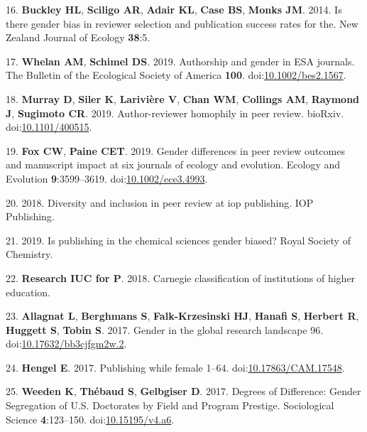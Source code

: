 \documentclass[11pt,]{article}
\begin{document}
\hypertarget{ref-buckley_is_2014}{}
16. \textbf{Buckley HL}, \textbf{Sciligo AR}, \textbf{Adair KL},
\textbf{Case BS}, \textbf{Monks JM}. 2014. Is there gender bias in
reviewer selection and publication success rates for the. New Zealand
Journal of Ecology \textbf{38}:5.

\hypertarget{ref-Whelan2019}{}
17. \textbf{Whelan AM}, \textbf{Schimel DS}. 2019. Authorship and gender
in ESA journals. The Bulletin of the Ecological Society of America
\textbf{100}.
doi:\href{https://doi.org/10.1002/bes2.1567}{10.1002/bes2.1567}.

\hypertarget{ref-Murray400515}{}
18. \textbf{Murray D}, \textbf{Siler K}, \textbf{Larivière V},
\textbf{Chan WM}, \textbf{Collings AM}, \textbf{Raymond J},
\textbf{Sugimoto CR}. 2019. Author-reviewer homophily in peer review.
bioRxiv. doi:\href{https://doi.org/10.1101/400515}{10.1101/400515}.

\hypertarget{ref-fox_gender_2019}{}
19. \textbf{Fox CW}, \textbf{Paine CET}. 2019. Gender differences in
peer review outcomes and manuscript impact at six journals of ecology
and evolution. Ecology and Evolution \textbf{9}:3599--3619.
doi:\href{https://doi.org/10.1002/ece3.4993}{10.1002/ece3.4993}.

\hypertarget{ref-Physics_2018}{}
20. 2018. Diversity and inclusion in peer review at iop publishing. IOP
Publishing.

\hypertarget{ref-RoyalChem_2019}{}
21. 2019. Is publishing in the chemical sciences gender biased? Royal
Society of Chemistry.

\hypertarget{ref-Carnegie2018}{}
22. \textbf{Research IUC for P}. 2018. Carnegie classification of
institutions of higher education.

\hypertarget{ref-allagnat_gender_2017}{}
23. \textbf{Allagnat L}, \textbf{Berghmans S}, \textbf{Falk-Krzesinski
HJ}, \textbf{Hanafi S}, \textbf{Herbert R}, \textbf{Huggett S},
\textbf{Tobin S}. 2017. Gender in the global research landscape 96.
doi:\href{https://doi.org/10.17632/bb3cjfgm2w.2}{10.17632/bb3cjfgm2w.2}.

\hypertarget{ref-erin_hengel_publishing_2017}{}
24. \textbf{Hengel E}. 2017. Publishing while female 1--64.
doi:\href{https://doi.org/10.17863/CAM.17548}{10.17863/CAM.17548}.

\hypertarget{ref-weeden_degrees_2017}{}
25. \textbf{Weeden K}, \textbf{Thébaud S}, \textbf{Gelbgiser D}. 2017.
Degrees of Difference: Gender Segregation of U.S. Doctorates by Field
and Program Prestige. Sociological Science \textbf{4}:123--150.
doi:\href{https://doi.org/10.15195/v4.a6}{10.15195/v4.a6}.
\end{document}
